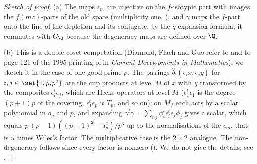 \begin{proof}[Sketch of proof]
(a) The maps $\epsilon_m$ are injective on the $f$-isotypic part with images the $f(mz)$-parts of the old space (multiplicity one, ), and $\gamma$ maps the $f$-part onto the
line of the depletion and its conjugate, by the $q$-expansion formula; it commutes with $G_\Q$ because the degeneracy maps are defined over $\Q$.

(b) This is a double-coset computation (Diamond, Flach and Guo refer to \cite[Chapter 2]{Wiles95} and to page 121 of the 1995 printing of \cite{DDT} in \emph{Current Developments in Mathematics}); we sketch it in the case of one good prime $p$. The
pairings $\hat\delta_!(\epsilon_ix,\epsilon_jy)$ for $i,j\in\set{1,p,p^2}$ are the cup products at level $M$ of $x$ with $y$ transformed by the composites $\epsilon_i^t\epsilon_j$, which are
Hecke operators at level $M$ ($\epsilon_1^t\epsilon_1$ is the degree $(p+1)p$ of the covering, $\epsilon_1^t\epsilon_p$ is $T_p$, and so on); on $M_f$ each acts by a scalar polynomial in $a_p$ and $p$, and
expanding $\gamma^t\gamma=\sum_{i,j}\phi_i^t\epsilon_i^t\epsilon_j\phi_j$ gives a scalar, which equals $p\,(p-1)((p+1)^2-a_p^2)/p^3$ up to the normalisations of the $\epsilon_m$, that is $u$ times Wiles's factor.
The multiplicative case is the $2\times2$ analogue. The non-degeneracy
follows since every factor is nonzero (). We do not give the details; see \cite[Section 1.7.3]{DFG04}.


\end{proof}
